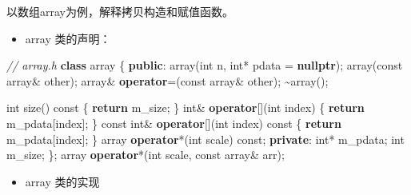 \documentclass[
]{article}
\newenvironment{Shaded}{}{}
\newcommand{\AttributeTok}[1]{\textcolor[rgb]{0.49,0.56,0.16}{#1}}
\newcommand{\CommentTok}[1]{\textcolor[rgb]{0.38,0.63,0.69}{\textit{#1}}}
\newcommand{\ControlFlowTok}[1]{\textcolor[rgb]{0.00,0.44,0.13}{\textbf{#1}}}
\newcommand{\DataTypeTok}[1]{\textcolor[rgb]{0.56,0.13,0.00}{#1}}
\newcommand{\KeywordTok}[1]{\textcolor[rgb]{0.00,0.44,0.13}{\textbf{#1}}}
\newcommand{\NormalTok}[1]{#1}
\newcommand{\OperatorTok}[1]{\textcolor[rgb]{0.40,0.40,0.40}{#1}}
\newcommand{\VariableTok}[1]{\textcolor[rgb]{0.10,0.09,0.49}{#1}}
\providecommand{\tightlist}{%
  \setlength{\itemsep}{0pt}\setlength{\parskip}{0pt}}
\begin{document}
以数组array为例，解释拷贝构造和赋值函数。

\begin{itemize}
\tightlist
\item
  array 类的声明：
\end{itemize}

\begin{Shaded}
\begin{Highlighting}[]
\CommentTok{// array.h}
\KeywordTok{class}\NormalTok{ array }\OperatorTok{\{}
\KeywordTok{public}\OperatorTok{:}
\NormalTok{    array}\OperatorTok{(}\DataTypeTok{int}\NormalTok{ n}\OperatorTok{,} \DataTypeTok{int}\OperatorTok{*}\NormalTok{ pdata }\OperatorTok{=} \KeywordTok{nullptr}\OperatorTok{);}
\NormalTok{    array}\OperatorTok{(}\AttributeTok{const}\NormalTok{ array}\OperatorTok{\&}\NormalTok{ other}\OperatorTok{);}
\NormalTok{    array}\OperatorTok{\&} \KeywordTok{operator}\OperatorTok{=(}\AttributeTok{const}\NormalTok{ array}\OperatorTok{\&}\NormalTok{ other}\OperatorTok{);}
    \OperatorTok{\textasciitilde{}}\NormalTok{array}\OperatorTok{();}

    \DataTypeTok{int}\NormalTok{ size}\OperatorTok{()} \AttributeTok{const} \OperatorTok{\{} \ControlFlowTok{return} \VariableTok{m\_size}\OperatorTok{;} \OperatorTok{\}}
    \DataTypeTok{int}\OperatorTok{\&} \KeywordTok{operator}\OperatorTok{[](}\DataTypeTok{int}\NormalTok{ index}\OperatorTok{)} \OperatorTok{\{} \ControlFlowTok{return} \VariableTok{m\_pdata}\OperatorTok{[}\NormalTok{index}\OperatorTok{];} \OperatorTok{\}}
    \AttributeTok{const} \DataTypeTok{int}\OperatorTok{\&} \KeywordTok{operator}\OperatorTok{[](}\DataTypeTok{int}\NormalTok{ index}\OperatorTok{)} \AttributeTok{const} \OperatorTok{\{} \ControlFlowTok{return} \VariableTok{m\_pdata}\OperatorTok{[}\NormalTok{index}\OperatorTok{];} \OperatorTok{\}}
\NormalTok{    array }\KeywordTok{operator}\OperatorTok{*(}\DataTypeTok{int}\NormalTok{ scale}\OperatorTok{)} \AttributeTok{const}\OperatorTok{;}
\KeywordTok{private}\OperatorTok{:}
    \DataTypeTok{int}\OperatorTok{*}    \VariableTok{m\_pdata}\OperatorTok{;}
    \DataTypeTok{int}     \VariableTok{m\_size}\OperatorTok{;}
\OperatorTok{\};}
\NormalTok{array }\KeywordTok{operator}\OperatorTok{*(}\DataTypeTok{int}\NormalTok{ scale}\OperatorTok{,} \AttributeTok{const}\NormalTok{ array}\OperatorTok{\&}\NormalTok{ arr}\OperatorTok{);}
\end{Highlighting}
\end{Shaded}

\begin{itemize}
\tightlist
\item
  array 类的实现
\end{itemize}
\end{document}
